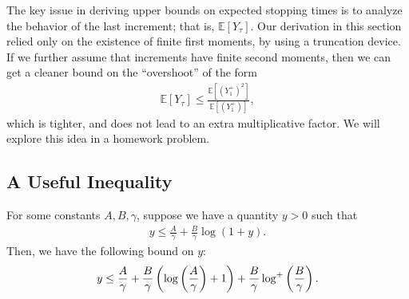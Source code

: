 \documentclass[12pt]{article}
\begin{document}
\begin{remark}
    The key issue in deriving  upper bounds on expected stopping times is to analyze the behavior of the last increment; that is, $\mathbb{E}[Y_\tau]$. 
    Our derivation in this section relied only on the existence of finite first moments, by using a truncation device. If we further assume that increments have finite second moments, then we can get a cleaner bound on the ``overshoot'' of the form 
    \begin{align}
        \mathbb{E}[Y_\tau] \leq \frac{\mathbb{E}[(Y_1^+)^2]}{\mathbb{E}[(Y_1^+)]}, 
    \end{align}
    which is tighter, and does not lead to an extra multiplicative factor. 
    We will explore this idea in a homework problem. 
\end{remark}
\begin{appendix}
    \section{A Useful Inequality}
    \label{proof:logarithmic-inequality}
    For some constants $A, B, \gamma$, suppose we have a quantity $y>0$ such that 
    \begin{align}
        y \leq \frac{A}{\gamma} + \frac{B}{\gamma} \log (1 + y). 
    \end{align}
    Then, we have the following bound on $y$: 
    \begin{align}
        y \leq \frac{A}{\gamma} + \frac{B}{\gamma} \left( \log \left( \frac A {\gamma} \right)  + 1\right) + \frac{B}{\gamma} \log^+ \left( \frac B {\gamma} \right). 
    \end{align}
\end{appendix}
\end{document}
